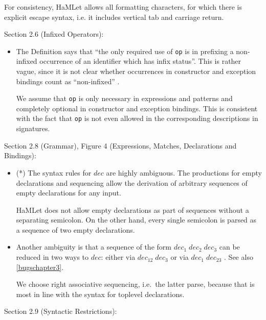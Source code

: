 \documentclass[twoside,titlepage]{article}
\begin{document}
\begin{appendix}
\begin{itemize}
For consistency, HaMLet allows all formatting characters, for which there is explicit escape syntax, i.e. it includes vertical tab and carriage return.
\end{itemize}


Section 2.6 (Infixed Operators):

\begin{itemize}

\item The Definition says that ``the only required use of {\tt op} is in prefixing a non-infixed occurrence of an identifier which has infix status''. This is rather vague, since it is not clear whether occurrences in constructor and exception bindings count as ``non-infixed'' \cite{mistakes}.

We assume that {\tt op} is only necessary in expressions and patterns and completely optional in constructor and exception bindings. This is consistent with the fact that {\tt op} is not even allowed in the corresponding descriptions in signatures.

\end{itemize}

Section 2.8 (Grammar), Figure 4 (Expressions, Matches, Declarations and Bindings):

\begin{itemize}

\item (*) The syntax rules for $\mathit{dec}$ are highly ambiguous. The productions for empty declarations and sequencing allow the derivation of arbitrary sequences of empty declarations for any input.

HaMLet does not allow empty declarations as part of sequences without a separating semicolon. On the other hand, every single semicolon is parsed as a sequence of two empty declarations.

\item Another ambiguity is that a sequence of the form $\mathit{dec}_1\;\mathit{dec}_2\;\mathit{dec}_3$ can be reduced in two ways to $\mathit{dec}$: either via $\mathit{dec}_{12}\;\mathit{dec}_3$ or via $\mathit{dec}_1\;\mathit{dec}_{23}$ \cite{mistakes}. See also \ref{bugschapter3}.

We choose right associative sequencing, i.e.\ the latter parse, because that is most in line with the syntax for toplevel declarations.

\end{itemize}


Section 2.9 (Syntactic Restrictions):


\end{appendix}
\end{document}
